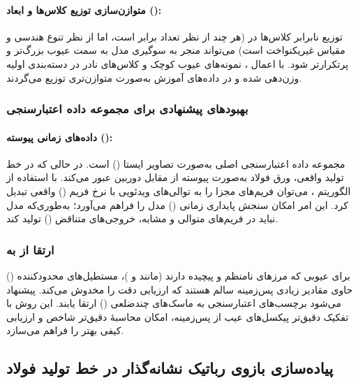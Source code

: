 \documentclass[a4paper, 10pt, twocolumn]{article}
\begin{document}
	\paragraph{متوازن‌سازی توزیع کلاس‌ها و ابعاد (): }
	
	توزیع نابرابر کلاس‌ها در  (هر چند از نظر تعداد برابر است، اما از نظر تنوع هندسی و مقیاس غیریکنواخت است) می‌تواند منجر به سوگیری مدل به سمت عیوب بزرگ‌تر و پرتکرارتر شود. با اعمال  ، نمونه‌های عیوب کوچک و کلاس‌های نادر در دسته‌بندی اولیه وزن‌دهی شده و در داده‌های آموزش به‌صورت متوازن‌تری توزیع می‌گردند.
	
	\subsubsection*{بهبودهای پیشنهادی برای مجموعه داده اعتبارسنجی}
	
	\paragraph{داده‌های زمانی پیوسته (): }
	
	مجموعه داده اعتبارسنجی اصلی  به‌صورت تصاویر ایستا () است. در حالی که در خط تولید واقعی، ورق فولاد به‌صورت پیوسته از مقابل دوربین عبور می‌کند. با استفاده از الگوریتم ، می‌توان فریم‌های مجزا را به توالی‌های ویدئویی با نرخ فریم () واقعی تبدیل کرد. این امر امکان سنجش پایداری زمانی () مدل را فراهم می‌آورد؛ به‌طوری‌که مدل نباید در فریم‌های متوالی و مشابه، خروجی‌های متناقض () تولید کند.
	
	\subsubsection*{ارتقا از  به }
	
	برای عیوبی که مرزهای نامنظم و پیچیده دارند (مانند  و )، مستطیل‌های محدودکننده () حاوی مقادیر زیادی پس‌زمینه سالم هستند که ارزیابی دقت  را مخدوش می‌کند. پیشنهاد می‌شود برچسب‌های اعتبارسنجی به ماسک‌های چندضلعی () ارتقا یابند. این روش با تفکیک دقیق‌تر پیکسل‌های عیب از پس‌زمینه، امکان محاسبهٔ دقیق‌تر شاخص  و ارزیابی کیفی بهتر را فراهم می‌سازد.
	
	
	\subsection{ پیاده‌سازی بازوی رباتیک نشانه‌گذار در خط تولید فولاد}
	
\end{document}
